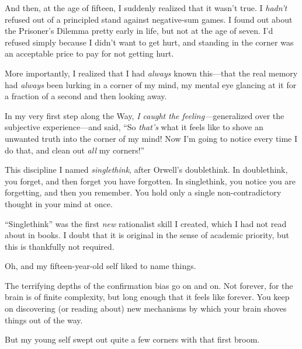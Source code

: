 {
 And then, at the age of fifteen, I suddenly realized that it
wasn't true. I \textit{hadn't} refused
out of a principled stand against negative-sum games. I found out about
the Prisoner's Dilemma pretty early in life, but not at
the age of seven. I'd refused simply because I
didn't want to get hurt, and standing in the corner was
an acceptable price to pay for not getting hurt.}

{
 More importantly, I realized that I had \textit{always} known
this---that the real memory had \textit{always} been lurking in a
corner of my mind, my mental eye glancing at it for a fraction of a
second and then looking away.}

{
 In my very first step along the Way, \textit{I caught the
feeling---}generalized over the subjective experience---and said,
``So \textit{that's} what it feels
like to shove an unwanted truth into the corner of my mind! Now
I'm going to notice every time I do that, and clean out
\textit{all} my corners!''}

{
 This discipline I named \textit{singlethink}, after
Orwell's doublethink. In doublethink, you forget, and
then forget you have forgotten. In singlethink, you notice you are
forgetting, and then you remember. You hold only a single
non-contradictory thought in your mind at once.}

{
 ``Singlethink'' was the first
\textit{new} rationalist skill I created, which I had not read about in
books. I doubt that it is original in the sense of academic priority,
but this is thankfully not required.}

{
 Oh, and my fifteen-year-old self liked to name things.}

{
 The terrifying depths of the confirmation bias go on and on. Not
forever, for the brain is of finite complexity, but long enough that it
feels like forever. You keep on discovering (or reading about) new
mechanisms by which your brain shoves things out of the way.}

{
 But my young self swept out quite a few corners with that first
broom.}

\myendsectiontext


